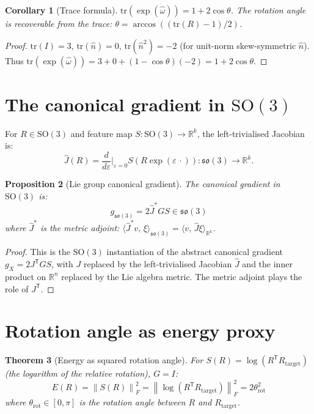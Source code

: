 \documentclass[11pt,a4paper,openany]{book}
\newtheorem{theorem}{Theorem}[chapter]
\newtheorem{proposition}[theorem]{Proposition}
\newtheorem{corollary}[theorem]{Corollary}
\theoremstyle{definition}
\newcommand{\R}{\mathbb{R}}
\newcommand{\T}{^{\mathsf{T}}}
\newcommand{\norm}[1]{\left\|#1\right\|}
\newcommand{\inner}[2]{\langle #1,\,#2\rangle}
\newcommand{\gX}{g_X}
\newcommand{\tr}{\mathrm{tr}}
\newcommand{\so}{\mathfrak{so}}
\newcommand{\SO}{\mathrm{SO}}
\begin{document}
\begin{corollary}[Trace formula]
$\tr(\exp(\hat\omega)) = 1 + 2\cos\theta$.
The rotation angle is recoverable from the trace: $\theta = \arccos((\tr(R)-1)/2)$.
\end{corollary}

\begin{proof}
$\tr(I) = 3$, $\tr(\hat n) = 0$, $\tr(\hat n^2) = -2$ (for unit-norm skew-symmetric $\hat n$).
Thus $\tr(\exp(\hat\omega)) = 3 + 0 + (1-\cos\theta)(-2) = 1 + 2\cos\theta$.
\end{proof}

\section{The canonical gradient in $\SO(3)$}

For $R \in \SO(3)$ and feature map $S : \SO(3) \to \R^k$, the left-trivialised Jacobian is:
\[
\hat J(R) = \frac{d}{d\varepsilon}\bigg|_{\varepsilon=0} S(R\exp(\varepsilon\,\cdot)) : \so(3) \to \R^k.
\]

\begin{proposition}[Lie group canonical gradient]
The canonical gradient in $\SO(3)$ is:
\[
g_{\so(3)} = 2\hat J^\ast G S \in \so(3)
\]
where $\hat J^\ast$ is the metric adjoint: $\inner{\hat J^\ast v}{\xi}_{\so(3)} = \inner{v}{\hat J\xi}_{\R^k}$.
\end{proposition}

\begin{proof}
This is the $\SO(3)$ instantiation of the abstract canonical gradient $\gX = 2J\T GS$,
with $J$ replaced by the left-trivialised Jacobian $\hat J$ and the inner product
on $\R^n$ replaced by the Lie algebra metric. The metric adjoint plays the role of $J\T$.
\end{proof}

\section{Rotation angle as energy proxy}

\begin{theorem}[Energy as squared rotation angle]
For $S(R) = \log(R\T R_\mathrm{target})$ (the logarithm of the relative rotation), $G = I$:
\[
E(R) = \norm{S(R)}_F^2 = \norm{\log(R\T R_\mathrm{target})}_F^2 = 2\theta_\mathrm{rot}^2
\]
where $\theta_\mathrm{rot} \in [0,\pi]$ is the rotation angle between $R$ and $R_\mathrm{target}$.
\end{theorem}
\end{document}
